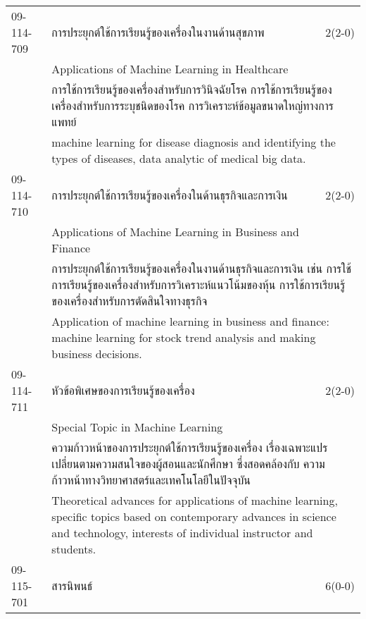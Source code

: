 \begin{longtable}{p{}p{}r{}}
09-114-709 & การประยุกต์ใช้การเรียนรู้ของเครื่องในงานด้านสุขภาพ  & 2(2-0)\\*
 & Applications of Machine Learning in Healthcare & \phantom{x} \vspace{3mm} \\*
&  \multicolumn{2}{p{0.75\textwidth}}{การใช้การเรียนรู้ของเครื่องสำหรับการวินิจฉัยโรค การใช้การเรียนรู้ของเครื่องสำหรับการระบุชนิดของโรค การวิเคราะห์ข้อมูลขนาดใหญ่ทางการแพทย์} \vspace{3mm} \\*
&  \multicolumn{2}{p{0.75\textwidth}}{machine learning for disease diagnosis and identifying the types of diseases, data analytic of medical big data.} \vspace{8mm} \\*
09-114-710 & การประยุกต์ใช้การเรียนรู้ของเครื่องในด้านธุรกิจและการเงิน & 2(2-0)\\*
 & Applications of Machine Learning in Business and Finance & \phantom{x} \vspace{3mm} \\*
&  \multicolumn{2}{p{0.75\textwidth}}{การประยุกต์ใช้การเรียนรู้ของเครื่องในงานด้านธุรกิจและการเงิน เช่น การใช้การเรียนรู้ของเครื่องสำหรับการวิเคราะห์แนวโน้มของหุ้น การใช้การเรียนรู้ของเครื่องสำหรับการตัดสินใจทางธุรกิจ} \vspace{3mm} \\*
&  \multicolumn{2}{p{0.75\textwidth}}{Application of machine learning in business and finance: machine learning for stock trend analysis and making business decisions.} \vspace{8mm} \\*
09-114-711 & หัวข้อพิเศษของการเรียนรู้ของเครื่อง  & 2(2-0)\\*
 & Special Topic in Machine Learning & \phantom{x} \vspace{3mm} \\*
&  \multicolumn{2}{p{0.75\textwidth}}{ความก้าวหน้าของการประยุกต์ใช้การเรียนรู้ของเครื่อง เรื่องเฉพาะแปรเปลี่ยนตามความสนใจของผู้สอนและนักศึกษา ซึ่งสอดคล้องกับ ความก้าวหน้าทางวิทยาศาสตร์และเทคโนโลยีในปัจจุบัน } \vspace{3mm} \\*
&  \multicolumn{2}{p{0.75\textwidth}}{Theoretical advances for applications of machine learning, specific topics based on contemporary advances in science and technology, interests of individual instructor and students.} \vspace{8mm} \\*
09-115-701 & สารนิพนธ์ & 6(0-0)\\*

\end{longtable}
